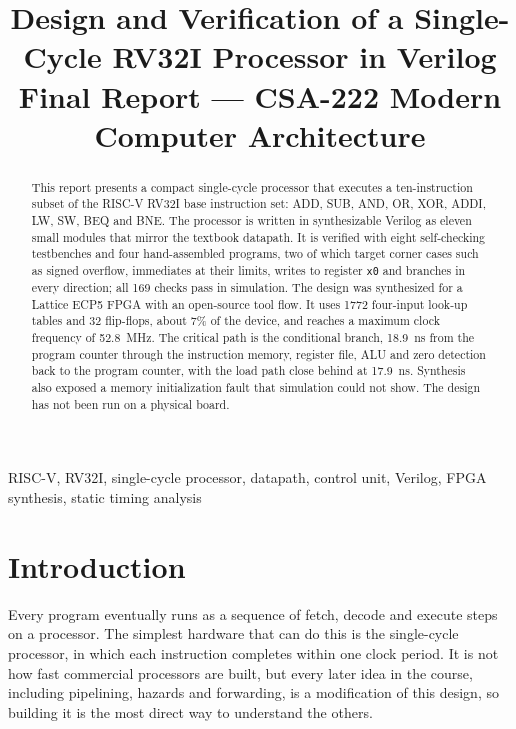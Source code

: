 \documentclass[conference]{IEEEtran}
\begin{document}
\title{Design and Verification of a Single-Cycle RV32I Processor in Verilog\\
{\large Final Report --- CSA-222 Modern Computer Architecture}}

\author{
}

\maketitle

\begin{abstract}
This report presents a compact single-cycle processor that executes a
ten-instruction subset of the RISC-V RV32I base instruction set: ADD, SUB,
AND, OR, XOR, ADDI, LW, SW, BEQ and BNE. The processor is written in
synthesizable Verilog as eleven small modules that mirror the textbook
datapath. It is verified with eight self-checking testbenches and four
hand-assembled programs, two of which target corner cases such as signed
overflow, immediates at their limits, writes to register \texttt{x0} and
branches in every direction; all 169 checks pass in simulation. The design
was synthesized for a Lattice ECP5 FPGA with an open-source tool flow. It
uses 1772 four-input look-up tables and 32 flip-flops, about 7\% of the
device, and reaches a maximum clock frequency of 52.8~MHz. The critical path
is the conditional branch, 18.9~ns from the program counter through the
instruction memory, register file, ALU and zero detection back to the
program counter, with the load path close behind at 17.9~ns. Synthesis also
exposed a memory initialization fault that simulation could not show. The
design has not been run on a physical board.
\end{abstract}

\begin{IEEEkeywords}
RISC-V, RV32I, single-cycle processor, datapath, control unit, Verilog, FPGA
synthesis, static timing analysis
\end{IEEEkeywords}

\section{Introduction}
Every program eventually runs as a sequence of fetch, decode and execute steps
on a processor. The simplest hardware that can do this is the single-cycle
processor, in which each instruction completes within one clock period. It is
not how fast commercial processors are built, but every later idea in the
course, including pipelining, hazards and forwarding, is a modification of
this design, so building it is the most direct way to understand the others.
\end{document}
